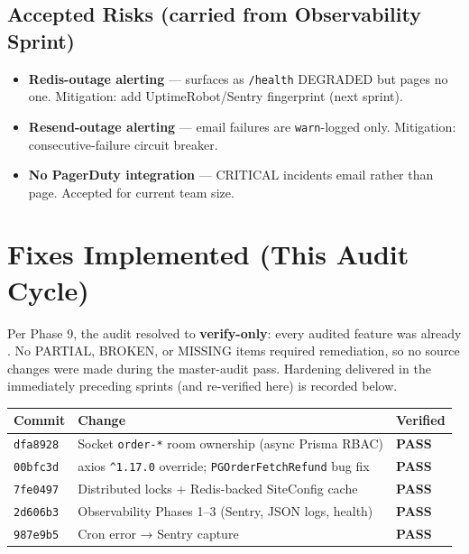 \documentclass[11pt,a4paper]{article}
\newcommand{\bcomplete}{\badge[ok]{COMPLETE}}
\newcommand{\cellok}[1]{\cellcolor{ok!15}\textbf{\color{ok}#1}}
\newcommand{\th}[1]{\textbf{\color{white}#1}}
\begin{document}
\subsection{Accepted Risks (carried from Observability Sprint)}
\begin{itemize}[leftmargin=1.4em,nosep]
  \item \textbf{Redis-outage alerting} — surfaces as \texttt{/health} DEGRADED but pages no one. Mitigation: add UptimeRobot/Sentry fingerprint (next sprint).
  \item \textbf{Resend-outage alerting} — email failures are \texttt{warn}-logged only. Mitigation: consecutive-failure circuit breaker.
  \item \textbf{No PagerDuty integration} — CRITICAL incidents email rather than page. Accepted for current team size.
\end{itemize}

\section{Fixes Implemented (This Audit Cycle)}

Per Phase 9, the audit resolved to \textbf{verify-only}: every audited feature was
already \bcomplete.  No PARTIAL, BROKEN, or MISSING items required remediation, so
no source changes were made during the master-audit pass.  Hardening delivered in
the immediately preceding sprints (and re-verified here) is recorded below.

\begin{center}\footnotesize
\begin{tabular}{p{2.2cm}p{8.5cm}p{2.3cm}}
\toprule
\rowcolor{headbg}\th{Commit} & \th{Change} & \th{Verified} \\
\midrule
\texttt{dfa8928} & Socket \texttt{order-*} room ownership (async Prisma RBAC) & \cellok{PASS} \\
\rowcolor{rowalt}\texttt{00bfc3d} & axios \texttt{\^{}1.17.0} override; \texttt{PGOrderFetchRefund} bug fix & \cellok{PASS} \\
\texttt{7fe0497} & Distributed locks + Redis-backed SiteConfig cache & \cellok{PASS} \\
\rowcolor{rowalt}\texttt{2d606b3} & Observability Phases 1–3 (Sentry, JSON logs, health) & \cellok{PASS} \\
\texttt{987e9b5} & Cron error → Sentry capture & \cellok{PASS} \\
\bottomrule
\end{tabular}
\end{center}
\end{document}
